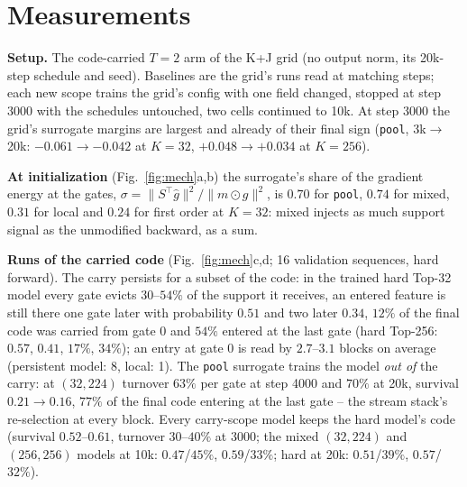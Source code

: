 \documentclass[10pt,a4paper]{article}
\newcommand{\code}[1]{\texttt{#1}}
\begin{document}
\section{Measurements}

\textbf{Setup.}  The code-carried \(T=2\) arm of the K+J grid (no output norm, its 20k-step schedule and seed).
Baselines are the grid's runs read at matching steps; each new scope trains the grid's config with one field changed, stopped at step 3000
with the schedules untouched, two cells continued to 10k.  At step 3000 the grid's surrogate margins are largest and already of their final sign
(\code{pool}, 3k\(\to\)20k: \(-0.061\to-0.042\) at \(K=32\), \(+0.048\to+0.034\) at \(K=256\)).

\textbf{At initialization} (Fig.~\ref{fig:mech}a,b) the surrogate's share of the gradient energy at the gates,
\(\sigma=\lVert S^\top\hat g\rVert^2/\lVert m\odot g\rVert^2\), is \(0.70\) for \code{pool}, \(0.74\) for mixed,
\(0.31\) for local and \(0.24\) for first order at \(K=32\): mixed injects as much support signal as the unmodified
backward, as a sum.

\textbf{Runs of the carried code} (Fig.~\ref{fig:mech}c,d; 16 validation sequences, hard forward).  The carry
persists for a subset of the code: in the trained hard Top-32 model every gate evicts
\(30\)--\(54\%\) of the support it receives, an entered feature is still there one gate later with probability
\(0.51\) and two later \(0.34\), \(12\%\) of the final code was carried from gate 0 and \(54\%\) entered at the last
gate (hard Top-256: \(0.57\), \(0.41\), \(17\%\), \(34\%\)); an entry at gate 0 is read by \(2.7\)--\(3.1\) blocks on
average (persistent model: 8, local: 1).  The \code{pool} surrogate trains the
model \emph{out of} the carry: at \((32,224)\) turnover \(63\%\) per gate at step 4000 and \(70\%\) at 20k, survival
\(0.21\to0.16\), \(77\%\) of the final code entering at the last gate -- the stream stack's re-selection at every
block.  Every carry-scope model keeps
the hard model's code (survival \(0.52\)--\(0.61\), turnover \(30\)--\(40\%\) at 3000; the mixed \((32,224)\) and
\((256,256)\) models at 10k: \(0.47\)/\(45\%\), \(0.59\)/\(33\%\); hard at 20k: \(0.51\)/\(39\%\), \(0.57\)/\(32\%\)).
\end{document}
